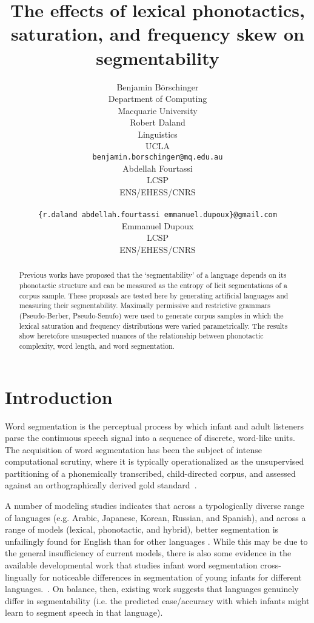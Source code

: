 \documentclass[11pt]{article}
\title{The effects of lexical phonotactics, saturation,
  and frequency skew on segmentability}
\author{Benjamin B{\"o}rschinger \\
    Department of Computing \\
    Macquarie University \\\And
  Robert Daland \\
    Linguistics \\
    UCLA \\
    {\tt benjamin.borschinger@mq.edu.au} \\\And
  Abdellah Fourtassi \\
    LCSP \\
    ENS/EHESS/CNRS \\
    \\
    {\tt \{r.daland\,abdellah.fourtassi\,emmanuel.dupoux\}@gmail.com} \\\And
  Emmanuel Dupoux \\
    LCSP \\
    ENS/EHESS/CNRS }
\date{}
\begin{document}
\maketitle
\begin{abstract}
  Previous works have proposed that the `segmentability' of a language
  depends on its phonotactic structure and can be measured as the
  entropy of licit segmentations of a corpus sample. These proposals
  are tested here by generating artificial languages and measuring
  their segmentability. Maximally permissive and restrictive grammars
  (Pseudo-Berber, Pseudo-Senufo) were used to generate corpus samples 
  in which the lexical saturation and frequency distributions were
  varied parametrically. %
  The results show heretofore  unsuspected nuances of the relationship
  between phonotactic complexity, word length, and word segmentation.
\end{abstract}


\section{Introduction}

Word segmentation is the perceptual process by which infant and adult listeners parse the continuous speech signal into a sequence of discrete, word-like units. The acquisition of word segmentation has been the subject of intense computational scrutiny, where it is typically operationalized as the unsupervised partitioning of a phonemically transcribed, child-directed corpus, and assessed against an orthographically derived gold standard~\cite{Goldwater09a,Daland11a,Pearl10b}.

A number of modeling studies indicates that across a typologically diverse range of languages (e.g. Arabic, Japanese, Korean, Russian, and Spanish), and across a range of models (lexical, phonotactic, and hybrid), better segmentation is unfailingly found for English than for other languages \cite{Fleck08a,Daland09a,Daland11a,Fourtassi13a,Daland13a}. %
While this may be due to the general insufficiency of current models, there is also some evidence in the available developmental work that studies infant word segmentation cross-lingually for noticeable differences in segmentation of young infants for different languages.~\cite{Nazzi06a}. On balance, then, existing work suggests that languages genuinely differ in segmentability (i.e. the predicted ease/accuracy with which infants might learn to segment speech in that language).
\end{document}
